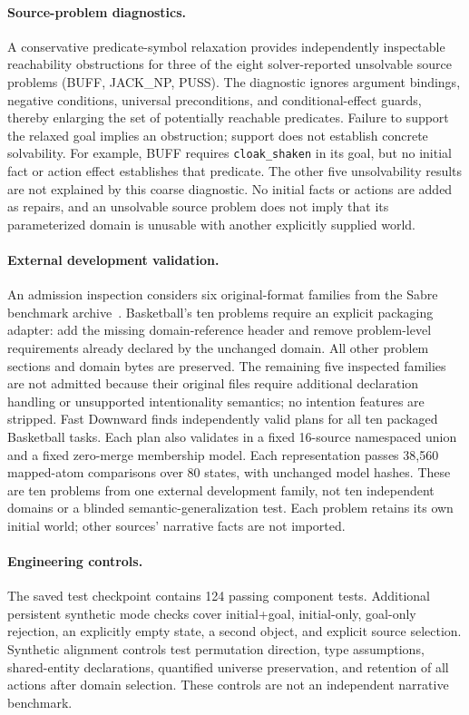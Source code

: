 \documentclass[letterpaper]{article}
\begin{document}
\paragraph{Source-problem diagnostics.}
A conservative predicate-symbol relaxation provides independently inspectable reachability obstructions for three of the eight solver-reported unsolvable source problems (BUFF, JACK\_NP, PUSS). The diagnostic ignores argument bindings, negative conditions, universal preconditions, and conditional-effect guards, thereby enlarging the set of potentially reachable predicates. Failure to support the relaxed goal implies an obstruction; support does not establish concrete solvability. For example, BUFF requires \texttt{cloak\_shaken} in its goal, but no initial fact or action effect establishes that predicate. The other five unsolvability results are not explained by this coarse diagnostic. No initial facts or actions are added as repairs, and an unsolvable source problem does not imply that its parameterized domain is unusable with another explicitly supplied world.

\paragraph{External development validation.}
An admission inspection considers six original-format families from the Sabre benchmark archive~\cite{ware2026collection}. Basketball's ten problems require an explicit packaging adapter: add the missing domain-reference header and remove problem-level requirements already declared by the unchanged domain. All other problem sections and domain bytes are preserved. The remaining five inspected families are not admitted because their original files require additional declaration handling or unsupported intentionality semantics; no intention features are stripped. Fast Downward finds independently valid plans for all ten packaged Basketball tasks. Each plan also validates in a fixed 16-source namespaced union and a fixed zero-merge membership model. Each representation passes 38,560 mapped-atom comparisons over 80 states, with unchanged model hashes. These are ten problems from one external development family, not ten independent domains or a blinded semantic-generalization test. Each problem retains its own initial world; other sources' narrative facts are not imported.

\paragraph{Engineering controls.}
The saved test checkpoint contains 124 passing component tests. Additional persistent synthetic mode checks cover initial+goal, initial-only, goal-only rejection, an explicitly empty state, a second object, and explicit source selection. Synthetic alignment controls test permutation direction, type assumptions, shared-entity declarations, quantified universe preservation, and retention of all actions after domain selection. These controls are not an independent narrative benchmark.
\end{document}
